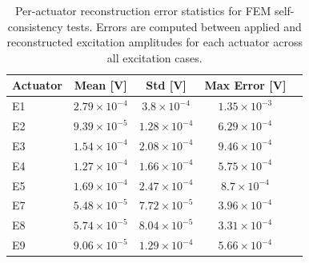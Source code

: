 \begin{table}[htbp]
    \centering
    \caption[Per-actuator reconstruction error statistics]{
    Per-actuator reconstruction error statistics for FEM self-consistency tests.
    Errors are computed between applied and reconstructed excitation amplitudes
    for each actuator across all excitation cases.}
    \label{tab:fem_consistency_per_actuator_stats}
    \small
    \begin{tabular}{lcccc}
        \toprule
        \textbf{Actuator} & \textbf{Mean} [V]& \textbf{ Std [V]} & \textbf{Max Error [V]} \\
        \midrule
            E1          & $2.79\times10^{-4}$  & $3.8\times10^{-4}$   &  $1.35\times10^{-3}$ \\
            E2           & $9.39\times10^{-5}$ & $1.28\times10^{-4}$   &  $6.29\times10^{-4}$ \\
            E3           & $1.54\times10^{-4}$ &$2.08\times10^{-4}$   &  $9.46\times10^{-4}$ \\
            E4           & $1.27\times10^{-4}$ & $1.66\times10^{-4}$   &  $5.75\times10^{-4}$ \\
            E5           & $1.69\times10^{-4}$ & $2.47\times10^{-4}$   &  $8.7\times10^{-4}$ \\
            E7           & $5.48\times10^{-5}$ & $7.72\times10^{-5}$   &  $3.96\times10^{-4}$ \\
            E8           & $5.74\times10^{-5}$& $8.04\times10^{-5}$   &  $3.31\times10^{-4}$ \\
            E9           & $9.06\times10^{-5}$ & $1.29\times10^{-4}$   &  $5.66\times10^{-4}$\\
        \bottomrule
    \end{tabular}
\end{table}

